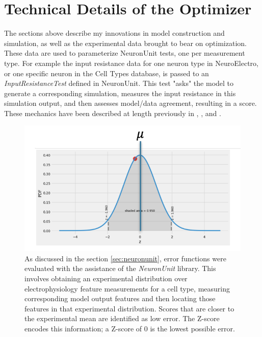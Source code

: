 \section{Technical Details of the Optimizer}
\label{sec:tech-details}
The sections above describe my innovations in model construction and simulation, as well as the experimental data brought to bear on optimization. These data are used to parameterize NeuronUnit tests, one per measurement type.
For example the input resistance data for one neuron type in NeuroElectro, or one specific neuron in the Cell Types database, is passed to an \textit{InputResistanceTest} defined in NeuronUnit.
This test "asks" the model to generate a corresponding simulation, measures the input resistance in this simulation output, and then assesses model/data agreement, resulting in a score.
These mechanics have been described at length previously in \cite{omar2014collaborative}, \cite{gerkin_neuronunit}, and \cite{birgiolas2019towards}.

\begin{figure}
\begin{center}
	\includegraphics{figures/normal_distribution}
    \caption[Z-scores for NeuronUnit Tests]{As discussed in the section \ref{sec:neuronunit}, error functions were evaluated with the assistance of the \emph{NeuronUnit} library.
    This involves obtaining an experimental distribution over electrophysiology feature measurements for a cell type, measuring corresponding model output features and then locating those features in that experimental distribution. 
    Scores that are closer to the experimental mean are identified as low error.
	The Z-score encodes this information; a Z-score of 0 is the lowest possible error.}
\end{center}
	
\end{figure}

